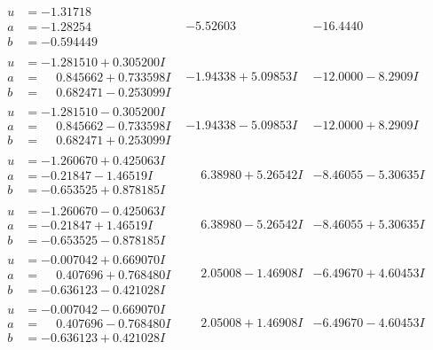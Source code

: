 \documentclass[1p]{elsarticle_modified}
\theoremstyle{definition}
\begin{document}
$$\begin{array}{c|c|c}
\begin{aligned}
u &= -1.31718\phantom{ +0.000000I} \\
a &= -1.28254\phantom{ +0.000000I} \\
b &= -0.594449\phantom{ +0.000000I}\end{aligned}
 & -5.52603\phantom{ +0.000000I} & -16.4440\phantom{ +0.000000I} \\ \hline\begin{aligned}
u &= -1.281510 + 0.305200 I \\
a &= \phantom{-}0.845662 + 0.733598 I \\
b &= \phantom{-}0.682471 - 0.253099 I\end{aligned}
 & -1.94338 + 5.09853 I & -12.0000 - 8.2909 I \\ \hline\begin{aligned}
u &= -1.281510 - 0.305200 I \\
a &= \phantom{-}0.845662 - 0.733598 I \\
b &= \phantom{-}0.682471 + 0.253099 I\end{aligned}
 & -1.94338 - 5.09853 I & -12.0000 + 8.2909 I \\ \hline\begin{aligned}
u &= -1.260670 + 0.425063 I \\
a &= -0.21847 - 1.46519 I \\
b &= -0.653525 + 0.878185 I\end{aligned}
 & \phantom{-}6.38980 + 5.26542 I & -8.46055 - 5.30635 I \\ \hline\begin{aligned}
u &= -1.260670 - 0.425063 I \\
a &= -0.21847 + 1.46519 I \\
b &= -0.653525 - 0.878185 I\end{aligned}
 & \phantom{-}6.38980 - 5.26542 I & -8.46055 + 5.30635 I \\ \hline\begin{aligned}
u &= -0.007042 + 0.669070 I \\
a &= \phantom{-}0.407696 + 0.768480 I \\
b &= -0.636123 - 0.421028 I\end{aligned}
 & \phantom{-}2.05008 - 1.46908 I & -6.49670 + 4.60453 I \\ \hline\begin{aligned}
u &= -0.007042 - 0.669070 I \\
a &= \phantom{-}0.407696 - 0.768480 I \\
b &= -0.636123 + 0.421028 I\end{aligned}
 & \phantom{-}2.05008 + 1.46908 I & -6.49670 - 4.60453 I \\ \hline\begin{aligned}

\end{aligned}
\end{array}$$
\end{document}
